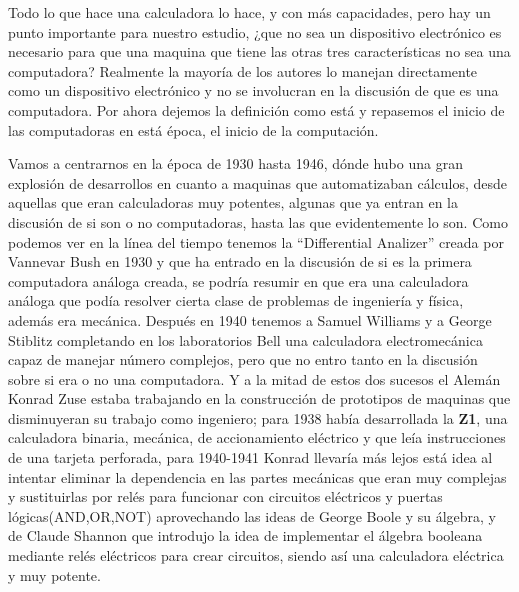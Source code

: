 \documentclass[letterpaper,12pt,oneside]{book}
\begin{document}
		Todo lo que hace una calculadora lo hace, y con más capacidades, pero hay un punto importante para nuestro estudio, ¿que no sea un dispositivo electrónico es
		necesario para que una maquina que tiene las otras tres características	no sea una computadora? Realmente la mayoría de los autores lo manejan directamente
		como un dispositivo electrónico y no se involucran en la discusión de que es una computadora. Por ahora dejemos la definición como está y repasemos
		el inicio de las computadoras en está época, el inicio de la computación.
		
		
		Vamos a centrarnos en la época de 1930 hasta 1946, dónde hubo una gran explosión de desarrollos en cuanto a maquinas que automatizaban cálculos, desde
		aquellas que eran calculadoras muy potentes, algunas que ya entran en la discusión de si son o no computadoras, hasta las que evidentemente lo son. Como
		podemos ver en la línea del tiempo tenemos la ``Differential Analizer'' creada por Vannevar Bush en 1930 y que ha entrado en la discusión de si es la
		primera computadora análoga creada, se podría resumir en que era una calculadora análoga que podía resolver cierta clase de problemas de ingeniería y física,
		además era mecánica. Después en 1940 tenemos a Samuel Williams y a George Stiblitz completando en los laboratorios Bell una calculadora electromecánica capaz
		de manejar número complejos, pero que no entro tanto en la discusión sobre si era o no una computadora. Y a la mitad de estos dos sucesos el Alemán Konrad
		Zuse estaba trabajando en la construcción de prototipos de maquinas que disminuyeran su trabajo como ingeniero; para 1938 había desarrollada la \textbf{Z1},
		una calculadora binaria, mecánica, de accionamiento eléctrico y que leía instrucciones de una tarjeta perforada, para 1940-1941 Konrad llevaría más lejos está idea
		al intentar eliminar la dependencia en las partes mecánicas que eran muy complejas y sustituirlas por relés para funcionar con circuitos eléctricos y
		puertas lógicas(AND,OR,NOT) aprovechando las ideas de George Boole y su álgebra, y de Claude Shannon que introdujo la idea de implementar
		el álgebra booleana mediante relés eléctricos para crear circuitos, siendo así una calculadora eléctrica y muy potente.
		
\end{document}
